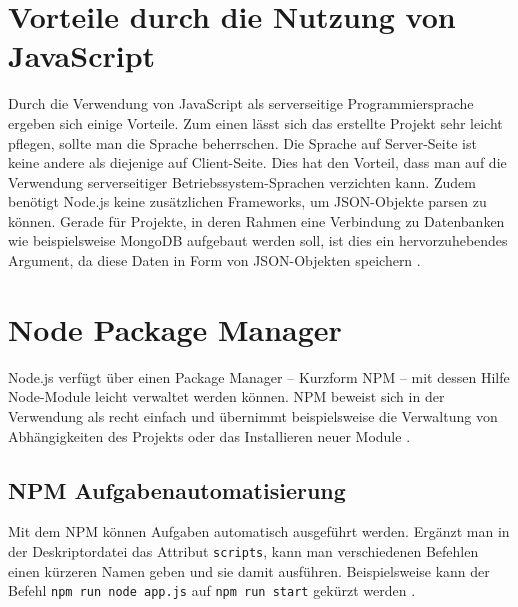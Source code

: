 \section{Vorteile durch die Nutzung von JavaScript}

Durch die Verwendung von JavaScript als serverseitige Programmiersprache ergeben sich einige Vorteile. Zum einen lässt sich das erstellte Projekt sehr leicht pflegen, sollte man die Sprache beherrschen. Die Sprache auf Server-Seite ist keine andere als diejenige auf Client-Seite. Dies hat den Vorteil, dass man auf die Verwendung serverseitiger Betriebssystem-Sprachen verzichten kann.
Zudem benötigt Node.js keine zusätzlichen Frameworks, um JSON-Objekte parsen zu können. Gerade für Projekte, in deren Rahmen eine Verbindung zu Datenbanken wie beispielsweise MongoDB aufgebaut werden soll, ist dies ein hervorzuhebendes Argument, da diese Daten in Form von JSON-Objekten speichern \cite[S.3]{neins}. 

\section{Node Package Manager}
Node.js verfügt über einen Package Manager – Kurzform NPM – mit dessen Hilfe Node-Module leicht verwaltet werden können. NPM beweist sich in der Verwendung als recht einfach und übernimmt beispielsweise die Verwaltung von Abhängigkeiten des Projekts oder das Installieren neuer Module \cite[S.10]{neins}. 

\subsection{NPM Aufgabenautomatisierung}

Mit dem NPM können Aufgaben automatisch ausgeführt werden. Ergänzt man in der Deskriptordatei das Attribut \texttt{scripts}, kann man verschiedenen Befehlen einen kürzeren Namen geben und sie damit ausführen. Beispielsweise kann der Befehl \texttt{npm run node app.js} auf \texttt{npm run start} gekürzt werden \cite[S.12]{neins}. 

